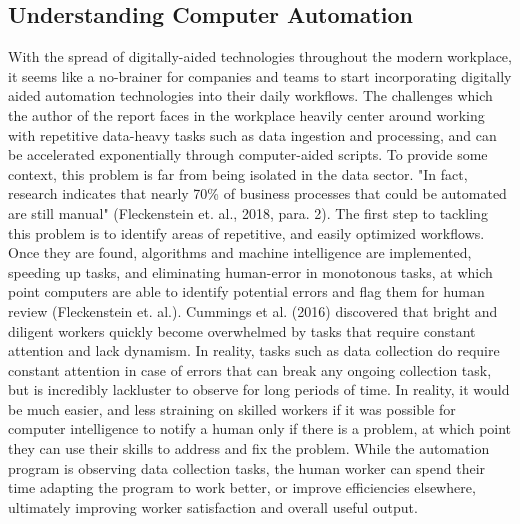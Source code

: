 \documentclass[12pt]{article}
\begin{document}
\subsection{Understanding Computer Automation}
With the spread of digitally-aided technologies throughout the modern workplace, it seems like a no-brainer for companies and teams to start incorporating digitally aided automation technologies into their daily workflows. The challenges which the author of the report faces in the workplace heavily center around working with repetitive data-heavy tasks such as data ingestion and processing, and can be accelerated exponentially through computer-aided scripts. To provide some context, this problem is far from being isolated in the data sector. "In fact, research indicates that nearly 70\% of business processes that could be automated are still manual" (Fleckenstein et. al., 2018, para. 2). The first step to tackling this problem is to identify areas of repetitive, and easily optimized workflows. Once they are found, algorithms and machine intelligence are implemented, speeding up tasks, and eliminating human-error in monotonous tasks, at which point computers are able to identify potential errors and flag them for human review (Fleckenstein et. al.).  Cummings et al. (2016) discovered that bright and diligent workers quickly become overwhelmed by tasks that require constant attention and lack dynamism. In reality, tasks such as data collection do require constant attention in case of errors that can break any ongoing collection task, but is incredibly lackluster to observe for long periods of time. In reality, it would be much easier, and less straining on skilled workers if it was possible for computer intelligence to notify a human only if there is a problem, at which point they can use their skills to address and fix the problem. While the automation program is observing data collection tasks, the human worker can spend their time adapting the program to work better, or improve efficiencies elsewhere, ultimately improving worker satisfaction and overall useful output. 

\newpage
\end{document}
